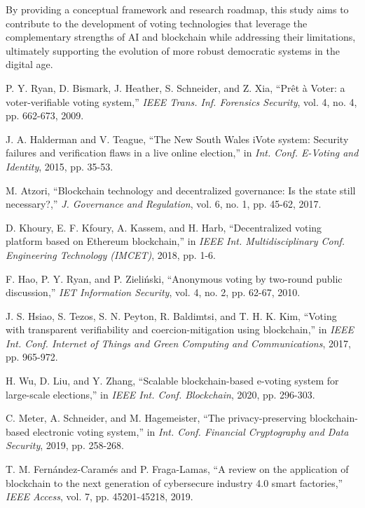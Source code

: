 \documentclass[conference]{IEEEtran}
\begin{document}
By providing a conceptual framework and research roadmap, this study aims to contribute to the development of voting technologies that leverage the complementary strengths of AI and blockchain while addressing their limitations, ultimately supporting the evolution of more robust democratic systems in the digital age.

\begin{thebibliography}{20}
P. Y. Ryan, D. Bismark, J. Heather, S. Schneider, and Z. Xia, ``Prêt à Voter: a voter-verifiable voting system,'' {\it IEEE Trans. Inf. Forensics Security}, vol. 4, no. 4, pp. 662-673, 2009.

J. A. Halderman and V. Teague, ``The New South Wales iVote system: Security failures and verification flaws in a live online election,'' in {\it Int. Conf. E-Voting and Identity}, 2015, pp. 35-53.

M. Atzori, ``Blockchain technology and decentralized governance: Is the state still necessary?,'' {\it J. Governance and Regulation}, vol. 6, no. 1, pp. 45-62, 2017.

D. Khoury, E. F. Kfoury, A. Kassem, and H. Harb, ``Decentralized voting platform based on Ethereum blockchain,'' in {\it IEEE Int. Multidisciplinary Conf. Engineering Technology (IMCET)}, 2018, pp. 1-6.

F. Hao, P. Y. Ryan, and P. Zieliński, ``Anonymous voting by two-round public discussion,'' {\it IET Information Security}, vol. 4, no. 2, pp. 62-67, 2010.

J. S. Hsiao, S. Tezos, S. N. Peyton, R. Baldimtsi, and T. H. K. Kim, ``Voting with transparent verifiability and coercion-mitigation using blockchain,'' in {\it IEEE Int. Conf. Internet of Things and Green Computing and Communications}, 2017, pp. 965-972.

H. Wu, D. Liu, and Y. Zhang, ``Scalable blockchain-based e-voting system for large-scale elections,'' in {\it IEEE Int. Conf. Blockchain}, 2020, pp. 296-303.

C. Meter, A. Schneider, and M. Hagemeister, ``The privacy-preserving blockchain-based electronic voting system,'' in {\it Int. Conf. Financial Cryptography and Data Security}, 2019, pp. 258-268.

T. M. Fernández-Caramés and P. Fraga-Lamas, ``A review on the application of blockchain to the next generation of cybersecure industry 4.0 smart factories,'' {\it IEEE Access}, vol. 7, pp. 45201-45218, 2019.


\end{thebibliography}
\end{document}
